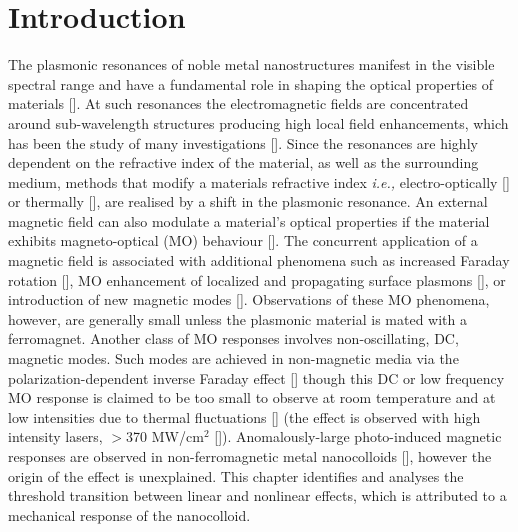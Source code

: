 \section{Introduction}
The plasmonic resonances of noble metal nanostructures manifest in the visible spectral range and have a fundamental role in shaping the optical properties of materials [\cite{Link,Cortie}]. At such resonances the electromagnetic fields are concentrated around sub-wavelength structures producing high local field enhancements, which has been the study of many investigations [\cite{Barnes,Kelly03,Ozbay}]. Since the resonances are highly dependent on the refractive index of the material, as well as the surrounding medium, methods that modify a materials refractive index \textit{i.e.,} electro-optically [\cite{Dicken,Chyou}] or thermally [\cite{Nikolajsen}], are realised by a shift in the plasmonic resonance. An external magnetic field can also modulate a material's optical properties if the material exhibits magneto-optical (MO) behaviour [\cite{Temnov,Gonzalez,Deng}]. The concurrent application of a magnetic field is associated with additional phenomena such as increased Faraday rotation [\cite{Du}], MO enhancement of localized and propagating surface plasmons [\cite{Sepulveda,Torrado}], or introduction of new magnetic modes [\cite{Pineider,Tang,FanSci}]. Observations of these MO phenomena, however, are generally small unless the plasmonic material is mated with a ferromagnet. Another class of MO responses involves non-oscillating, DC, magnetic modes. Such modes are achieved in non-magnetic media via the polarization-dependent inverse Faraday effect [\cite{Hertel}] though this DC or low frequency MO response is claimed to be too small to observe at room temperature and at low intensities due to thermal fluctuations [\cite{Gu}] (the effect is observed with high intensity lasers, $>$370 MW/cm$^2$ [\cite{Raja}]). Anomalously-large photo-induced magnetic responses are observed in non-ferromagnetic metal nanocolloids [\cite{Singh}], however the origin of the effect is unexplained. This chapter identifies and analyses the threshold transition between linear and nonlinear effects, which is attributed to a mechanical response of the nanocolloid.

